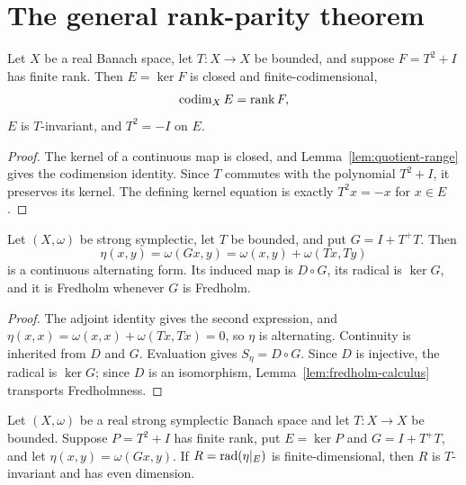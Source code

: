 \section{The general rank-parity theorem}

\begin{lemma}\label{lem:finite-rank-kernel}
Let $X$ be a real Banach space, let $T:X\to X$ be bounded, and suppose $F=T^2+I$ has finite rank.  Then
$E=\ker F$ is closed and finite-codimensional,
\[
  \operatorname{codim}_XE=\operatorname{rank} F,
\]
$E$ is $T$-invariant, and $T^2=-I$ on $E$.
\leanok
\end{lemma}

\begin{proof}
The kernel of a continuous map is closed, and Lemma~\ref{lem:quotient-range} gives the codimension
identity.  Since $T$ commutes with the polynomial $T^2+I$, it preserves its kernel.  The defining
kernel equation is exactly $T^2x=-x$ for $x\in E$.
\end{proof}

\begin{lemma}\label{lem:rank-parity-form}
Let $(X,\omega)$ be strong symplectic, let $T$ be bounded, and put $G=I+T^+T$.  Then
\[
  \eta(x,y)=\omega(Gx,y)=\omega(x,y)+\omega(Tx,Ty)
\]
is a continuous alternating form.  Its induced map is $D\circ G$, its radical is $\ker G$, and it
is Fredholm whenever $G$ is Fredholm.
\leanok
\end{lemma}

\begin{proof}
The adjoint identity gives the second expression, and
$\eta(x,x)=\omega(x,x)+\omega(Tx,Tx)=0$, so $\eta$ is alternating.  Continuity is inherited from
$D$ and $G$.  Evaluation gives $S_\eta=D\circ G$.  Since $D$ is injective, the radical is
$\ker G$; since $D$ is an isomorphism, Lemma~\ref{lem:fredholm-calculus} transports Fredholmness.
\end{proof}

\begin{lemma}\label{lem:restricted-radical-even}
Let $(X,\omega)$ be a real strong symplectic Banach space and let $T:X\to X$ be bounded.  Suppose
$P=T^2+I$ has finite rank, put $E=\ker P$ and $G=I+T^+T$, and let
$\eta(x,y)=\omega(Gx,y)$.  If $R=\operatorname{rad}(\eta|_E)$ is finite-dimensional, then $R$ is $T$-invariant
and has even dimension.
\leanok
\end{lemma}

